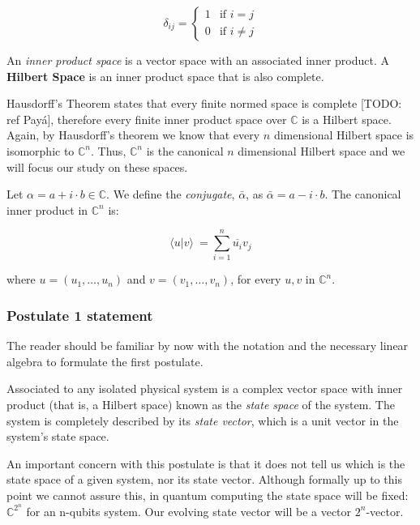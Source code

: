 \documentclass{article}
\begin{document}
	\[
	\delta_{ij} = 
	\begin{cases}
		1 & \text{if } i = j  \\
		0 & \text{if } i \neq j
	\end{cases}
	\]
	
	\begin{definition}
		An \emph{inner product space} is a vector space with an associated inner product. A \textbf{Hilbert Space} is an inner product space that is also complete.
	\end{definition}
	
	Hausdorff's Theorem states that every finite normed space is complete [TODO: ref Payá], therefore every finite inner product space over $\mathds{C}$ is a Hilbert space. Again, by Hausdorff's theorem we know that every $n$ dimensional Hilbert space is isomorphic to $\mathds{C}^n$. Thus, $\mathds{C}^n$ is the canonical $n$ dimensional Hilbert space and we will focus our study on these spaces.
	
	Let $\alpha = a + i \cdot b\in \mathds{C}$. We define the \emph{conjugate}, $\bar \alpha$, as $\bar \alpha = a - i \cdot b$. The canonical inner product in $\mathds{C}^n$ is:
	
	$$ \langle u|v \rangle \ = \sum_{i=1}^n \overline{u_i}v_j $$
	
	where $u = (u_1, \dotsc, u_n)$ and $v = (v_1, \dotsc, v_n)$, for every $u,v$ in $\mathds{C}^n$.
	
	
	\subsubsection{Postulate 1 statement}
	
	
	The reader should be familiar by now with the notation and the necessary linear algebra to formulate the first postulate.
	
	\begin{postulate}
		Associated to any isolated physical system is a complex vector space with inner product (that is, a Hilbert space) known as the \emph{state space} of the system. The system is completely described by its \emph{state vector}, which is a unit vector in the system’s state space.
	\end{postulate}
	
	An important concern with this postulate is that it does not tell us which is the state space of a given system, nor its state vector. Although formally up to this point we cannot assure this, in quantum computing the state space will be fixed: $\mathds{C}^{2^n}$ for an n-qubits system. Our evolving state vector will be a vector $2^n$-vector.
	
\end{document}
